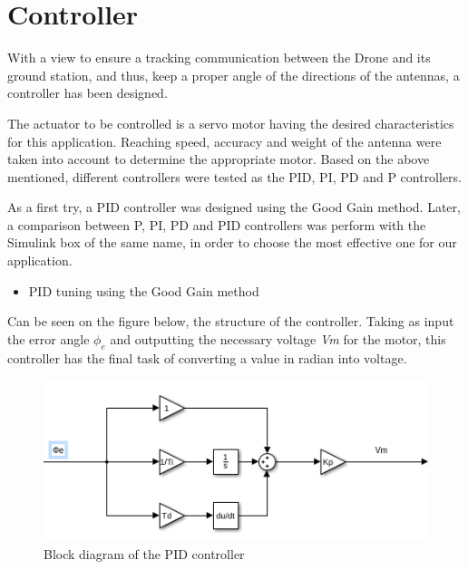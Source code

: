 \section{Controller}\label{sec:controller}

With a view to ensure a tracking communication between the Drone and its ground station, and thus, keep a proper angle of the directions of the antennas, a controller has been designed.\par

The actuator to be controlled is a servo motor having the desired characteristics for this application.  Reaching speed, accuracy and weight of the antenna were taken into account to determine the appropriate motor. Based on the above mentioned, different controllers were tested as the PID, PI, PD and P controllers.\par 	
As a first try, a PID controller was designed using the Good Gain method. Later, a comparison between P, PI, PD and PID controllers was perform with the Simulink box of the same name, in order to choose the most effective one for our application.\par 	

\begin{Large}
  \begin{itemize}
   \item PID tuning using the Good Gain method
  \end{itemize}
\end{Large}

Can be seen on the figure below, the structure of the controller. Taking as input the error angle \textbf{$\phi_{e}$} and outputting the necessary voltage \textit{Vm} for the motor, this controller has the final task of converting a value in radian into voltage.\par

\begin{figure}[H]
  \centering
  \includegraphics[scale=0.5]{figures/PID_2D.png}
  \caption[LABEL] {Block diagram of the PID controller}
\end{figure}
  
